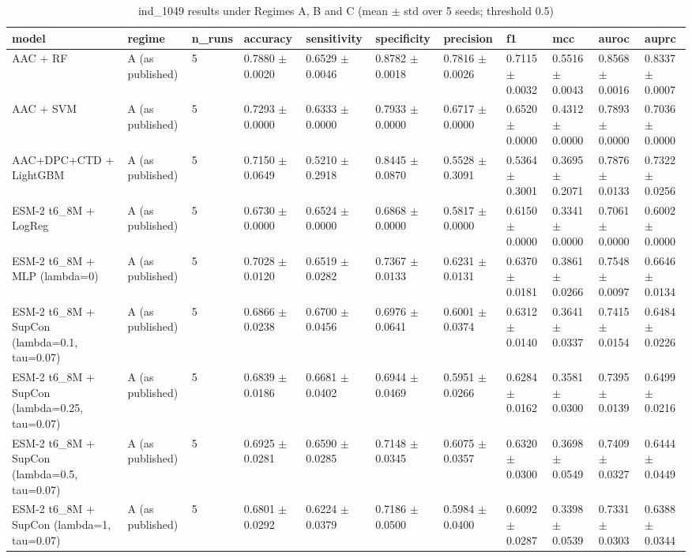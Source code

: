 \begin{table}[ht]
\centering\small
\caption{ind\_1049 results under Regimes A, B and C (mean $\pm$ std over 5 seeds; threshold 0.5)}
\label{tab:T5_3_ind1049}
\begin{tabular}{lllllllllll}
\hline
model & regime & n\_runs & accuracy & sensitivity & specificity & precision & f1 & mcc & auroc & auprc \\
\hline
AAC + RF & A (as published) & 5 & 0.7880 $\pm$ 0.0020 & 0.6529 $\pm$ 0.0046 & 0.8782 $\pm$ 0.0018 & 0.7816 $\pm$ 0.0026 & 0.7115 $\pm$ 0.0032 & 0.5516 $\pm$ 0.0043 & 0.8568 $\pm$ 0.0016 & 0.8337 $\pm$ 0.0007 \\
AAC + SVM & A (as published) & 5 & 0.7293 $\pm$ 0.0000 & 0.6333 $\pm$ 0.0000 & 0.7933 $\pm$ 0.0000 & 0.6717 $\pm$ 0.0000 & 0.6520 $\pm$ 0.0000 & 0.4312 $\pm$ 0.0000 & 0.7893 $\pm$ 0.0000 & 0.7036 $\pm$ 0.0000 \\
AAC+DPC+CTD + LightGBM & A (as published) & 5 & 0.7150 $\pm$ 0.0649 & 0.5210 $\pm$ 0.2918 & 0.8445 $\pm$ 0.0870 & 0.5528 $\pm$ 0.3091 & 0.5364 $\pm$ 0.3001 & 0.3695 $\pm$ 0.2071 & 0.7876 $\pm$ 0.0133 & 0.7322 $\pm$ 0.0256 \\
ESM-2 t6\_8M + LogReg & A (as published) & 5 & 0.6730 $\pm$ 0.0000 & 0.6524 $\pm$ 0.0000 & 0.6868 $\pm$ 0.0000 & 0.5817 $\pm$ 0.0000 & 0.6150 $\pm$ 0.0000 & 0.3341 $\pm$ 0.0000 & 0.7061 $\pm$ 0.0000 & 0.6002 $\pm$ 0.0000 \\
ESM-2 t6\_8M + MLP (lambda=0) & A (as published) & 5 & 0.7028 $\pm$ 0.0120 & 0.6519 $\pm$ 0.0282 & 0.7367 $\pm$ 0.0133 & 0.6231 $\pm$ 0.0131 & 0.6370 $\pm$ 0.0181 & 0.3861 $\pm$ 0.0266 & 0.7548 $\pm$ 0.0097 & 0.6646 $\pm$ 0.0134 \\
ESM-2 t6\_8M + SupCon (lambda=0.1, tau=0.07) & A (as published) & 5 & 0.6866 $\pm$ 0.0238 & 0.6700 $\pm$ 0.0456 & 0.6976 $\pm$ 0.0641 & 0.6001 $\pm$ 0.0374 & 0.6312 $\pm$ 0.0140 & 0.3641 $\pm$ 0.0337 & 0.7415 $\pm$ 0.0154 & 0.6484 $\pm$ 0.0226 \\
ESM-2 t6\_8M + SupCon (lambda=0.25, tau=0.07) & A (as published) & 5 & 0.6839 $\pm$ 0.0186 & 0.6681 $\pm$ 0.0402 & 0.6944 $\pm$ 0.0469 & 0.5951 $\pm$ 0.0266 & 0.6284 $\pm$ 0.0162 & 0.3581 $\pm$ 0.0300 & 0.7395 $\pm$ 0.0139 & 0.6499 $\pm$ 0.0216 \\
ESM-2 t6\_8M + SupCon (lambda=0.5, tau=0.07) & A (as published) & 5 & 0.6925 $\pm$ 0.0281 & 0.6590 $\pm$ 0.0285 & 0.7148 $\pm$ 0.0345 & 0.6075 $\pm$ 0.0357 & 0.6320 $\pm$ 0.0300 & 0.3698 $\pm$ 0.0549 & 0.7409 $\pm$ 0.0327 & 0.6444 $\pm$ 0.0449 \\
ESM-2 t6\_8M + SupCon (lambda=1, tau=0.07) & A (as published) & 5 & 0.6801 $\pm$ 0.0292 & 0.6224 $\pm$ 0.0379 & 0.7186 $\pm$ 0.0500 & 0.5984 $\pm$ 0.0400 & 0.6092 $\pm$ 0.0287 & 0.3398 $\pm$ 0.0539 & 0.7331 $\pm$ 0.0303 & 0.6388 $\pm$ 0.0344 \\

\end{tabular}
\end{table}
